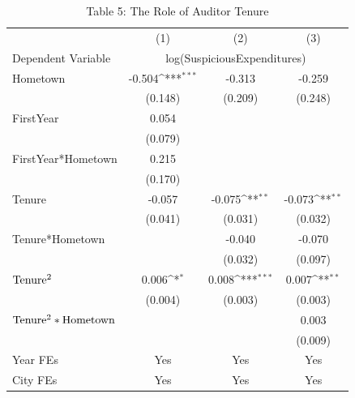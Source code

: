 \begin{table}[p]\centering\captionsetup{width=\textwidth,labelformat=empty}\begin{threeparttable}\footnotesize{
\def\sym#1{\ifmmode^{#1}\else\(^{#1}\)\fi}
\caption{Table 5: The Role of Auditor Tenure}
\begin{tabular}{l*{3}{c}}
\hline\hline
                    &\multicolumn{1}{c}{(1)}         &\multicolumn{1}{c}{(2)}         &\multicolumn{1}{c}{(3)}         \\
Dependent Variable & \multicolumn{3}{c}{ log(SuspiciousExpenditures) }  \\
\hline
Hometown            &      -0.504\sym{***}&      -0.313         &      -0.259         \\
                    &     (0.148)         &     (0.209)         &     (0.248)         \\
FirstYear           &       0.054         &                     &                     \\
                    &     (0.079)         &                     &                     \\
FirstYear*Hometown  &       0.215         &                     &                     \\
                    &     (0.170)         &                     &                     \\
Tenure              &      -0.057         &      -0.075\sym{**} &      -0.073\sym{**} \\
                    &     (0.041)         &     (0.031)         &     (0.032)         \\
Tenure*Hometown     &                     &      -0.040         &      -0.070         \\
                    &                     &     (0.032)         &     (0.097)         \\
\(\rm Tenure^2 \)   &       0.006\sym{*}  &       0.008\sym{***}&       0.007\sym{**} \\
                    &     (0.004)         &     (0.003)         &     (0.003)         \\
\(\rm Tenure^2*Hometown\)&                     &                     &       0.003         \\
                    &                     &                     &     (0.009)         \\
\hline
Year FEs         & Yes & Yes & Yes \\
City FEs         & Yes & Yes & Yes \\

\end{tabular}}
\end{threeparttable}
\end{table}
